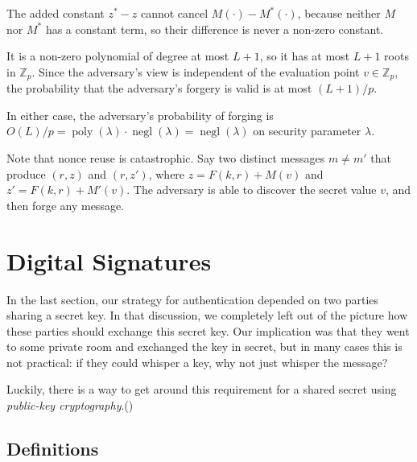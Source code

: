 \documentclass[
  letterpaper,
]{scrbook}
\newcommand{\Z}{\mathbb{Z}}
\newcommand{\poly}{\operatorname{poly}}
\newcommand{\negl}{\operatorname{negl}}
\theoremstyle{definition}
\theoremstyle{plain}
\theoremstyle{plain}
\theoremstyle{remark}
\begin{document}
\begin{itemize}
\begin{itemize}
{\begin{footnotesize}
    The added constant \(z^* - z\) cannot cancel
    \(M(\cdot) - M^*(\cdot)\), because neither \(M\) nor \(M^*\) has a
    constant term, so their difference is never a non-zero constant.

    \end{footnotesize}}

    It is a non-zero polynomial of degree at most \(L+1\), so it has at
    most \(L+1\) roots in \(\Z_p\). Since the adversary's view is
    independent of the evaluation point \(v \in \Z_p\), the probability
    that the adversary's forgery is valid is at most \((L+1)/p\).
  \end{itemize}

  In either case, the adversary's probability of forging is
  \(O(L)/p = \poly(\lambda) \cdot \negl(\lambda) = \negl(\lambda)\) on
  security parameter \(\lambda\).
\end{itemize}

Note that nonce reuse is catastrophic. Say two distinct messages
\(m \neq m'\) that produce \((r, z)\) and \((r, z')\), where
\(z = F(k,r) + M(v)\) and \(z' = F(k,r) + M'(v)\). The adversary is able
to discover the secret value \(v\), and then forge any message.

\chapter{Digital Signatures}\label{sec-sig}

In the last section, our strategy for authentication depended on two
parties sharing a secret key. In that discussion, we completely left out
of the picture how these parties should exchange this secret key. Our
implication was that they went to some private room and exchanged the
key in secret, but in many cases this is not practical: if they could
whisper a key, why not just whisper the message?

Luckily, there is a way to get around this requirement for a shared
secret using \emph{public-key cryptography}.()


\section{Definitions}\label{definitions}
\end{document}
